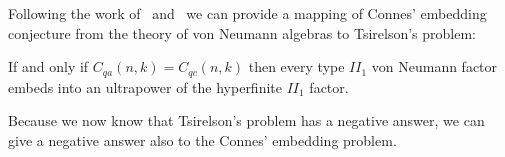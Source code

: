 Following the work of~\cite{Tsirelson_1} and~\cite{Tsirelson_2} we can provide a mapping of Connes' embedding conjecture from the theory of von Neumann algebras to Tsirelson's problem:

\begin{theorem}
If and only if $C_{q a}(n, k) = C_{q c}(n, k)$ then every type $II_1$ von Neumann factor embeds into an ultrapower of the hyperfinite $II_1$ factor.
\end{theorem}

Because we now know that Tsirelson's problem has a negative answer, we can give a negative answer also to the Connes' embedding problem.

